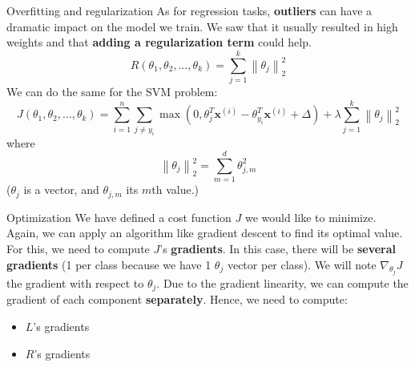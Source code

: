 \documentclass{beamer}
\newcommand{\1}[1]{\mathbbm{1}\left[#1\right]}
\newcommand{\norm}[1]{\left\lVert#1\right\rVert}
\newcommand{\bx}{\bm{x}}
\newcommand{\bxi}{\bx^{(i)}}
\newcommand{\pv}{\pause\vfill}
\begin{document}
\begin{frame}{Overfitting and regularization}
As for regression tasks, \textbf{outliers} can have a dramatic impact on the model we train. We saw that it usually resulted in high weights and that \textbf{adding a regularization term} could help.
\begin{equation*}
R(\theta_1, \theta_2, \dots, \theta_k) = \sum_{j = 1}^k \norm{\theta_j}_2^2
\end{equation*}
\pv
We can do the same for the SVM problem:
\begin{equation*}
J(\theta_1, \theta_2, \dots, \theta_k) 
	= \sum_{i = 1}^n \sum_{j \neq y_i} 
	\max(0, \theta_j^T\bxi - \theta_{y_i}^T\bxi + \Delta)
	+ \lambda \sum_{j = 1}^k \norm{\theta_j}_2^2
\end{equation*}
where
\begin{equation*}
\norm{\theta_j}_2^2 = \sum_{m = 1}^d \theta_{j,m}^2
\end{equation*}
($\theta_j$ is a vector, and $\theta_{j,m}$ its $m$th value.)
\end{frame}

\begin{frame}{Optimization}
We have defined a cost function $J$ we would like to minimize. Again, we can apply an algorithm like gradient descent to find its optimal value. For this, we need to compute $J$'s \textbf{gradients}.
\pv
In this case, there will be \textbf{several gradients} (1 per class because we have 1 $\theta_j$ vector per class). We will note $\nabla_{\theta_j}J$ the gradient with respect to $\theta_j$.
\pv
Due to the gradient linearity, we can compute the gradient of each component \textbf{separately}. Hence, we need to compute:
\begin{itemize}
	\item $L$'s gradients
	\item $R$'s gradients
\end{itemize}
\end{frame}
\end{document}
